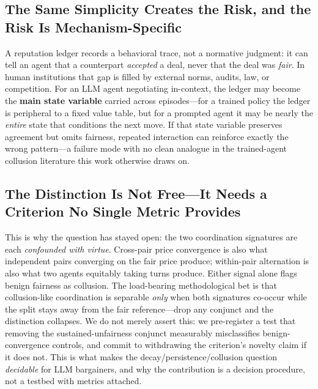 \documentclass[conference]{IEEEtran}
\begin{document}
\subsection{The Same Simplicity Creates the Risk, and the Risk Is
Mechanism-Specific}
A reputation ledger records a behavioral trace, not a normative judgment: it
can tell an agent that a counterpart \emph{accepted} a deal, never that the
deal was \emph{fair}. In human institutions that gap is filled by external
norms, audits, law, or competition. For an LLM agent negotiating in-context,
the ledger may become the \textbf{main state variable} carried across
episodes---for a trained policy the ledger is peripheral to a fixed value
table, but for a prompted agent it may be nearly the \emph{entire} state that
conditions the next move. If that state variable preserves agreement but omits
fairness, repeated interaction can reinforce exactly the wrong pattern---a
failure mode with no clean analogue in the trained-agent collusion literature
this work otherwise draws on.

\subsection{The Distinction Is Not Free---It Needs a Criterion No Single
Metric Provides}
This is why the question has stayed open: the two coordination signatures are
each \emph{confounded with virtue}. Cross-pair price convergence is also what
independent pairs converging on the fair price produce; within-pair
alternation is also what two agents equitably taking turns produce. Either
signal alone flags benign fairness as collusion. The load-bearing
methodological bet is that collusion-like coordination is separable
\emph{only} when both signatures co-occur while the split stays away from the
fair reference---drop any conjunct and the distinction collapses. We do not
merely assert this: we pre-register a test that removing the
sustained-unfairness conjunct measurably misclassifies benign-convergence
controls, and commit to withdrawing the criterion's novelty claim if it does
not. This is what makes the decay/persistence/collusion question
\emph{decidable} for LLM bargainers, and why the contribution is a decision
procedure, not a testbed with metrics attached.
\end{document}
